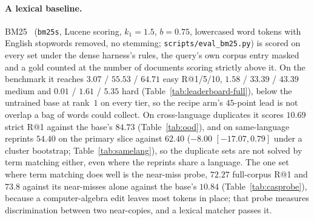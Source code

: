 \paragraph{A lexical baseline.}BM25~\citep{robertson2009bm25} (\texttt{bm25s}, Lucene scoring, $k_1 = 1.5$, $b = 0.75$, lowercased word tokens with English stopwords removed, no stemming; \texttt{scripts/eval\_bm25.py}) is scored on every set under the dense harness's rules, the query's own corpus entry masked and a gold counted at the number of documents scoring strictly above it. On the benchmark it reaches $3.07$ / $55.53$ / $64.71$ easy R@1/5/10, $1.58$ / $33.39$ / $43.39$ medium and $0.01$ / $1.61$ / $5.35$ hard (Table~\ref{tab:leaderboard-full}), below the untrained base at rank~$1$ on every tier, so the recipe arm's $45$-point lead is not overlap a bag of words could collect. On cross-language duplicates it scores $10.69$ strict R@1 against the base's $84.73$ (Table~\ref{tab:ood}), and on same-language reprints $54.40$ on the primary slice against $62.40$ ($-8.00$ $[-17.07, 0.79]$ under a cluster bootstrap; Table~\ref{tab:samelang}), so the duplicate sets are not solved by term matching either, even where the reprints share a language. The one set where term matching does well is the near-miss probe, $72.27$ full-corpus R@1 and $73.8$ against its near-misses alone against the base's $10.84$ (Table~\ref{tab:casprobe}), because a computer-algebra edit leaves most tokens in place; that probe measures discrimination between two near-copies, and a lexical matcher passes it.



